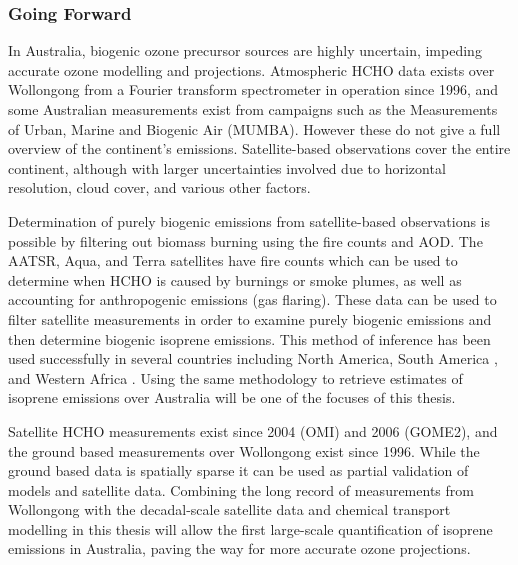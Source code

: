 \subsubsection{Going Forward}
In Australia, biogenic ozone precursor sources are highly uncertain, impeding accurate ozone modelling and projections.
Atmospheric HCHO data exists over Wollongong from a Fourier transform spectrometer in operation since 1996, and some Australian measurements exist from campaigns such as the Measurements of Urban, Marine and Biogenic Air (MUMBA).
However these do not give a full overview of the continent's emissions. Satellite-based observations cover the entire continent, although with larger uncertainties involved due to horizontal resolution, cloud cover, and various other factors. 

Determination of purely biogenic emissions from satellite-based observations is possible by filtering out biomass burning using the fire counts and AOD.
The AATSR, Aqua, and Terra satellites have fire counts which can be used to determine when HCHO is caused by burnings or smoke plumes, as well as accounting for anthropogenic emissions (gas flaring).
These data can be used to filter satellite measurements in order to examine purely biogenic emissions and then determine biogenic isoprene emissions.
This method of inference has been used successfully in several countries including North America\cite{Palmer_2003}, South America \cite{Barkley_2013}, and Western Africa \cite{Marais_2012}.
Using the same methodology to retrieve estimates of isoprene emissions over Australia will be one of the focuses of this thesis.

Satellite HCHO measurements exist since 2004 (OMI) and 2006 (GOME2), and the ground based measurements over Wollongong exist since 1996. While the ground based data is spatially sparse it can be used as partial validation of models and satellite data. 
Combining the long record of measurements from Wollongong with the decadal-scale satellite data and chemical transport modelling in this thesis will allow the first large-scale quantification of isoprene emissions in Australia, paving the way for more accurate ozone projections.

